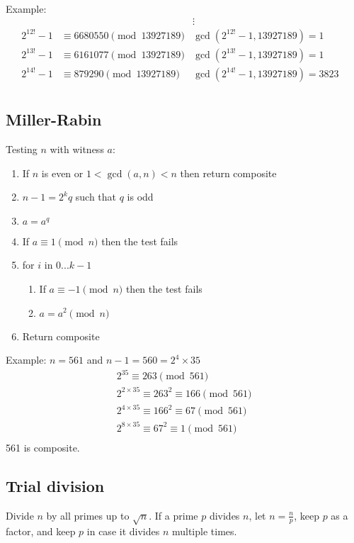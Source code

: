 \documentclass{article}
\begin{document}
Example:
\begin{align*}
    & &\vdots & \\
    2^{12!} - 1 &\equiv 6680550 \pmod{13927189} & \gcd(2^{12!} - 1, 13927189) = 1 \\
    2^{13!} - 1 &\equiv 6161077 \pmod{13927189} & \gcd(2^{13!} - 1, 13927189) = 1 \\
    2^{14!} - 1 &\equiv 879290  \pmod{13927189} & \gcd(2^{14!} - 1, 13927189) = 3823 \\
\end{align*}

\subsection*{Miller-Rabin}
Testing $n$ with witness $a$:
\begin{enumerate}
    \item If $n$ is even or $1 < \gcd(a, n) < n$ then return composite
    \item $n - 1 = 2^k q$ such that $q$ is odd
    \item $a = a^q$
    \item If $a \equiv 1 \pmod{n}$ then the test fails
    \item for $i$ in $0...k-1$
    \begin{enumerate}
        \item If $a \equiv -1 \pmod{n}$ then the test fails
        \item $a = a^2 \pmod{n}$
    \end{enumerate}
    \item Return composite
\end{enumerate}

Example:
$n = 561$ and $n - 1 = 560 = 2^4 \times 35$
\begin{align*}
    2^{35} \equiv 263 \pmod{561} \\
    2^{2 \times 35} \equiv 263^2 \equiv 166 \pmod{561} \\
    2^{4 \times 35} \equiv 166^2 \equiv 67 \pmod{561} \\
    2^{8 \times 35} \equiv 67^2 \equiv 1 \pmod{561} \\
\end{align*}
561 is composite.

\subsection*{Trial division}
Divide $n$ by all primes up to $\sqrt{n}$. If a prime $p$ divides $n$, let $n = \frac{n}{p}$, keep $p$ as a factor, and keep $p$ in case it divides $n$ multiple times.
\end{document}
